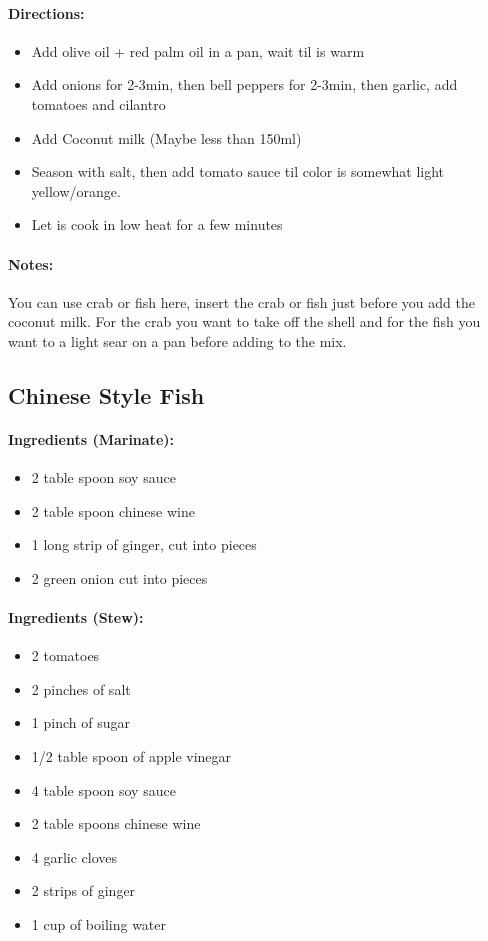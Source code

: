 \documentclass{article}
\begin{document}
\paragraph{Directions:}
\begin{itemize}
	\item Add olive oil + red palm oil in a pan, wait til is warm
	\item Add onions for 2-3min, then bell peppers for 2-3min, then garlic, add tomatoes and cilantro
	\item Add Coconut milk (Maybe less than 150ml)
	\item Season with salt, then add tomato sauce til color is somewhat light yellow/orange.
	\item Let is cook in low heat for a few minutes
\end{itemize}

\paragraph{Notes:} You can use crab or fish here, insert the crab or fish just before you add the coconut milk. For the crab you want to take off the shell and for the fish you want to a light sear on a pan before adding to the mix.

\subsection{Chinese Style Fish}

\paragraph{Ingredients (Marinate):}

\begin{itemize}
	\item 2 table spoon soy sauce
	\item 2 table spoon chinese wine
	\item 1 long strip of ginger, cut into pieces
	\item 2 green onion cut into pieces
\end{itemize}

\paragraph{Ingredients (Stew):}

\begin{itemize}
	\item 2 tomatoes
	\item 2 pinches of salt
	\item 1 pinch of sugar
	\item 1/2 table spoon of apple vinegar
	\item 4 table spoon soy sauce
	\item 2 table spoons chinese wine
	\item 4 garlic cloves
	\item 2 strips of ginger
	\item 1 cup of boiling water
\end{itemize}
\end{document}
